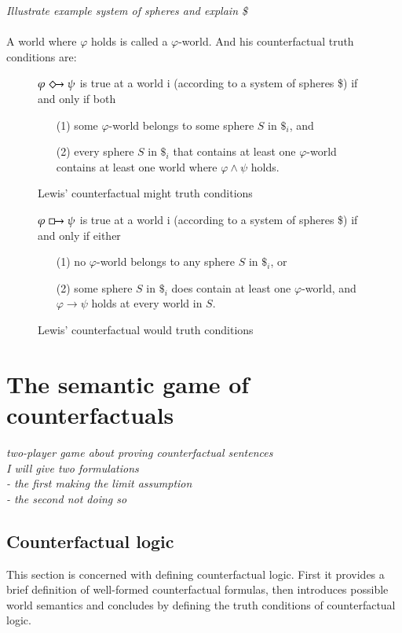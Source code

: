 \documentclass[a4paper,american]{paper}
\theoremstyle{definition}\newtheorem{definition}{Definition}
\begin{document}
\noindent \textit{Illustrate example system of spheres and explain \$}\\\\
A world where $\varphi$ holds is called a $\varphi$-world.
\noindent And his counterfactual truth conditions are:
\begin{figure}[H]
	\centering
	$\varphi\Diamondright\psi$ is true at a world i (according to a system of spheres \$) if and only if both
	\begin{itemize}
	\item[(1)] some $\varphi$-world belongs to some sphere $S$ in $\$_i$, and
	\item[(2)] every sphere $S$ in $\$_i$ that contains at least one $\varphi$-world contains at least one world where $\varphi\wedge\psi$ holds.
	\end{itemize}
	\caption{Lewis' counterfactual might truth conditions}
	\label{fig:counterfactual_might}
\end{figure}
\begin{figure}[H]
	\centering
	$\varphi\boxright\psi$ is true at a world i (according to a system of spheres \$) if and only if either
	\begin{itemize}
	\item[(1)] no $\varphi$-world belongs to any sphere $S$ in $\$_i$, or
	\item[(2)] some sphere $S$ in $\$_i$ does contain at least one $\varphi$-world, and $\varphi\rightarrow\psi$ holds at every world in $S$.
	\end{itemize}
	\caption{Lewis' counterfactual would truth conditions}
	\label{fig:counterfactual_would}
\end{figure}
\section{The semantic game of counterfactuals}
\textit{two-player game about proving counterfactual sentences\\
I will give two formulations\\
- the first making the limit assumption\\
- the second not doing so}
\subsection{Counterfactual logic}
This section is concerned with defining counterfactual logic. First it provides a brief definition of well-formed counterfactual formulas, then introduces possible world semantics and concludes by defining the truth conditions of counterfactual logic.
\end{document}
